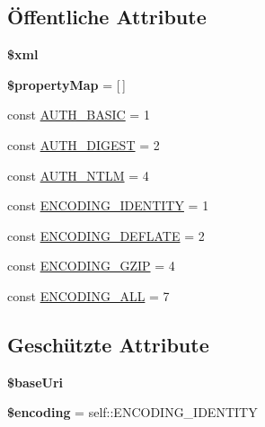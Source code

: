 \subsection*{Öffentliche Attribute}
\begin{DoxyCompactItemize}
\item 
\mbox{\label{class_sabre_1_1_d_a_v_1_1_client_a903e42be2d4bf0bfa3cb4185af4e51fa}} 
{\bfseries \$xml}
\item 
\mbox{\label{class_sabre_1_1_d_a_v_1_1_client_a2de82a8924e4cab82cfb535a3b4d884c}} 
{\bfseries \$property\+Map} = \mbox{[}$\,$\mbox{]}
\item 
const \mbox{\hyperlink{class_sabre_1_1_d_a_v_1_1_client_a0640e670c3f47d225b41eefa1a919d83}{A\+U\+T\+H\+\_\+\+B\+A\+S\+IC}} = 1
\item 
const \mbox{\hyperlink{class_sabre_1_1_d_a_v_1_1_client_a3bcce431a79f7b4ae19340f69af0c6db}{A\+U\+T\+H\+\_\+\+D\+I\+G\+E\+ST}} = 2
\item 
const \mbox{\hyperlink{class_sabre_1_1_d_a_v_1_1_client_ae6e94ad3226d89837244d6a772d48a68}{A\+U\+T\+H\+\_\+\+N\+T\+LM}} = 4
\item 
const \mbox{\hyperlink{class_sabre_1_1_d_a_v_1_1_client_a46b7f1a329a3e8480fc3df2849fe9e63}{E\+N\+C\+O\+D\+I\+N\+G\+\_\+\+I\+D\+E\+N\+T\+I\+TY}} = 1
\item 
const \mbox{\hyperlink{class_sabre_1_1_d_a_v_1_1_client_a36960e861f446b0ccf8ac262b446de6d}{E\+N\+C\+O\+D\+I\+N\+G\+\_\+\+D\+E\+F\+L\+A\+TE}} = 2
\item 
const \mbox{\hyperlink{class_sabre_1_1_d_a_v_1_1_client_a988e7881eea63d98221f1d99ccc75d51}{E\+N\+C\+O\+D\+I\+N\+G\+\_\+\+G\+Z\+IP}} = 4
\item 
const \mbox{\hyperlink{class_sabre_1_1_d_a_v_1_1_client_acfa346837f2ab23a11d2b6d2af40a886}{E\+N\+C\+O\+D\+I\+N\+G\+\_\+\+A\+LL}} = 7
\end{DoxyCompactItemize}
\subsection*{Geschützte Attribute}
\begin{DoxyCompactItemize}
\item 
\mbox{\label{class_sabre_1_1_d_a_v_1_1_client_adc34a420265ee1db8ef826bc8366b7e6}} 
{\bfseries \$base\+Uri}
\item 
\mbox{\label{class_sabre_1_1_d_a_v_1_1_client_a384e4ac865b086b5ca493be03e6275a9}} 
{\bfseries \$encoding} = self\+::\+E\+N\+C\+O\+D\+I\+N\+G\+\_\+\+I\+D\+E\+N\+T\+I\+TY
\end{DoxyCompactItemize}
